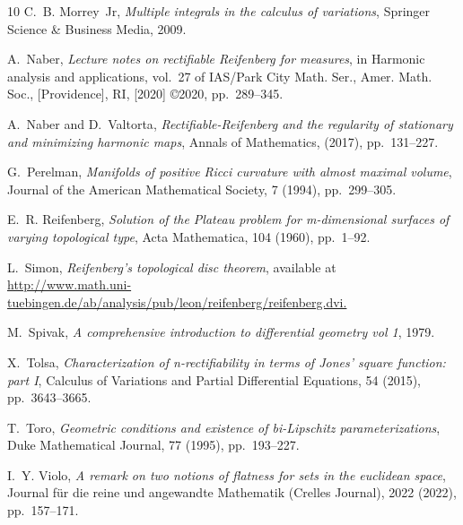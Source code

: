 \documentclass[11pt]{article}
\theoremstyle{plain}
\theoremstyle{definition}
\numberwithin{equation}{section}
\begin{document}
\begin{thebibliography}{10}
{\sc C.~B. Morrey~Jr}, {\em Multiple integrals in the calculus of variations},
  Springer Science \& Business Media, 2009.

{\sc A.~Naber}, {\em Lecture notes on rectifiable {R}eifenberg for measures},
  in Harmonic analysis and applications, vol.~27 of IAS/Park City Math. Ser.,
  Amer. Math. Soc., [Providence], RI, [2020] \copyright 2020, pp.~289--345.

{\sc A.~Naber and D.~Valtorta}, {\em Rectifiable-{R}eifenberg and the
  regularity of stationary and minimizing harmonic maps}, Annals of
  Mathematics,  (2017), pp.~131--227.

{\sc G.~Perelman}, {\em Manifolds of positive {R}icci curvature with almost
  maximal volume}, Journal of the American Mathematical Society, 7 (1994),
  pp.~299--305.

{\sc E.~R. Reifenberg}, {\em Solution of the {P}lateau problem for
  m-dimensional surfaces of varying topological type}, Acta Mathematica, 104
  (1960), pp.~1--92.

{\sc L.~Simon}, {\em Reifenberg’s topological disc theorem}, available at
  \url{http://www.math.uni-tuebingen.de/ab/analysis/pub/leon/reifenberg/reifenberg.dvi.}

{\sc M.~Spivak}, {\em A comprehensive introduction to differential geometry vol
  1}, 1979.

{\sc X.~Tolsa}, {\em Characterization of n-rectifiability in terms of
  {J}ones’ square function: part {I}}, Calculus of Variations and Partial
  Differential Equations, 54 (2015), pp.~3643--3665.

{\sc T.~Toro}, {\em Geometric conditions and existence of bi-{L}ipschitz
  parameterizations}, Duke Mathematical Journal, 77 (1995), pp.~193--227.

{\sc I.~Y. Violo}, {\em A remark on two notions of flatness for sets in the
  euclidean space}, Journal für die reine und angewandte Mathematik (Crelles
  Journal), 2022 (2022), pp.~157--171.

\end{thebibliography}
\end{document}
